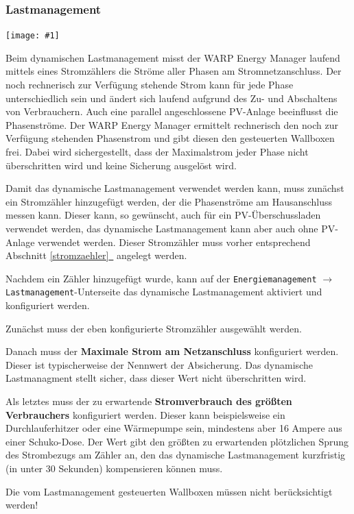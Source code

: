 \documentclass[a4paper,10pt]{article}
\newcommand{\hint}[1]{\begin{tcolorbox}[colback=boxgray,colframe=black,coltext=
white,title=Hinweis,left*=2mm,right*=2mm,boxsep=1mm,bottom=1mm,top=1mm]#1\end{tcolorbox}}
\newcommand{\gfx}[1]{\texttt{[image: \#1]}}
\newcommand*{\fullref}[1]{Abschnitt \hyperref[{#1}]{\ref*{#1}~\nameref*{#1}}}
\begin{document}
\begin{multicols*}{2}
    
	\subsubsection{Lastmanagement}
    
    \gfx{./img_v2/wem2-web-load-management}

	Beim dynamischen Lastmanagement misst der WARP Energy Manager laufend mittels eines Stromzählers die
	Ströme aller Phasen am Stromnetzanschluss. Der noch rechnerisch zur
	Verfügung stehende Strom kann für jede Phase unterschiedlich sein und ändert
	sich laufend aufgrund des Zu- und Abschaltens von Verbrauchern. Auch eine
	parallel angeschlossene PV-Anlage beeinflusst die Phasenströme. Der WARP
	Energy Manager ermittelt rechnerisch den noch zur Verfügung stehenden
	Phasenstrom und gibt diesen den gesteuerten Wallboxen frei.
	Dabei wird sichergestellt, dass der Maximalstrom jeder Phase nicht überschritten wird und keine Sicherung ausgelöst wird.

    Damit das dynamische Lastmanagement verwendet werden kann, muss zunächst ein
    Stromzähler hinzugefügt werden, der die Phasenströme am Hausanschluss messen kann.
    Dieser kann, so gewünscht, auch für ein PV-Überschussladen verwendet werden,
    das dynamische Lastmanagement kann aber auch ohne PV-Anlage verwendet werden. Dieser Stromzähler muss vorher entsprechend \fullref{stromzaehler} angelegt werden.

    Nachdem ein Zähler hinzugefügt wurde, kann auf der \texttt{Energiemanagement} $\rightarrow$ \texttt{Lastmanagement}-Unterseite das dynamische Lastmanagement aktiviert und konfiguriert werden.

    Zunächst muss der eben konfigurierte Stromzähler ausgewählt werden.

    Danach muss der \textbf{Maximale Strom am Netzanschluss} konfiguriert werden. Dieser ist typischerweise der Nennwert der Absicherung. 
    Das dynamische Lastmanagment stellt sicher, dass dieser Wert nicht überschritten wird.

    Als letztes muss der zu erwartende \textbf{Stromverbrauch des größten Verbrauchers} konfiguriert werden. 
    Dieser kann beispielsweise ein Durchlauferhitzer oder eine Wärmepumpe sein, mindestens aber 16 Ampere aus einer Schuko-Dose. 
    Der Wert gibt den größten zu er­war­ten­den plötz­li­chen Sprung des Strom­bezugs am Zähler an, den das dy­na­mi­sche Last­manage­ment kurz­fris­tig (in unter 30 Sekunden) kom­pen­sieren können muss.

    \hint{Die vom Last­manage­ment ge­steu­er­ten Wallboxen müssen nicht be­rück­sich­tigt werden!}



\end{multicols*}
\end{document}
